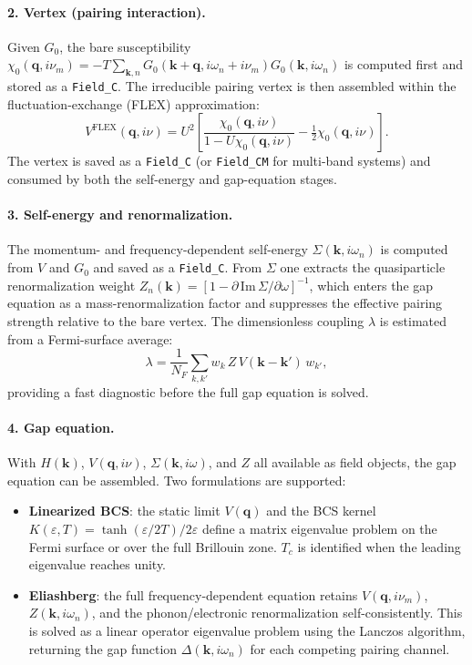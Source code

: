 \paragraph{2. Vertex (pairing interaction).}
Given $G_0$, the bare susceptibility
$\chi_0(\mathbf{q},i\nu_m) = -T\sum_{\mathbf{k},n} G_0(\mathbf{k}+\mathbf{q},i\omega_n+i\nu_m)
G_0(\mathbf{k},i\omega_n)$
is computed first and stored as a \texttt{Field\_C}.  The irreducible pairing vertex
is then assembled within the fluctuation-exchange (FLEX) approximation:
\[
    V^{\mathrm{FLEX}}(\mathbf{q},i\nu) =
    U^2 \left[\frac{\chi_0(\mathbf{q},i\nu)}{1 - U\chi_0(\mathbf{q},i\nu)}
    - \tfrac{1}{2}\chi_0(\mathbf{q},i\nu)\right].
\]
The vertex is saved as a \texttt{Field\_C} (or \texttt{Field\_CM} for multi-band
systems) and consumed by both the self-energy and gap-equation stages.

\paragraph{3. Self-energy and renormalization.}
The momentum- and frequency-dependent self-energy
$\Sigma(\mathbf{k},i\omega_n)$ is computed from $V$ and $G_0$ and saved as a
\texttt{Field\_C}.  From $\Sigma$ one extracts the quasiparticle renormalization
weight $Z_n(\mathbf{k}) = [1 - \partial\,\mathrm{Im}\,\Sigma/\partial\omega]^{-1}$,
which enters the gap equation as a mass-renormalization factor and suppresses
the effective pairing strength relative to the bare vertex.  The dimensionless
coupling $\lambda$ is estimated from a Fermi-surface average:
\[
    \lambda = \frac{1}{N_F}\sum_{k,k'} w_k\,Z\,V(\mathbf{k}-\mathbf{k}')\,w_{k'},
\]
providing a fast diagnostic before the full gap equation is solved.

\paragraph{4. Gap equation.}
With $H(\mathbf{k})$, $V(\mathbf{q},i\nu)$, $\Sigma(\mathbf{k},i\omega)$, and $Z$
all available as field objects, the gap equation can be assembled.  Two formulations
are supported:

\begin{itemize}
    \item \textbf{Linearized BCS}: the static limit $V(\mathbf{q})$ and the BCS
        kernel $K(\varepsilon,T) = \tanh(\varepsilon/2T)/2\varepsilon$ define a
        matrix eigenvalue problem on the Fermi surface or over the full Brillouin
        zone.  $T_c$ is identified when the leading eigenvalue reaches unity.
    \item \textbf{Eliashberg}: the full frequency-dependent equation
        retains $V(\mathbf{q},i\nu_m)$, $Z(\mathbf{k},i\omega_n)$, and the
        phonon/electronic renormalization self-consistently.  This is solved as a
        linear operator eigenvalue problem using the Lanczos algorithm, returning
        the gap function $\Delta(\mathbf{k},i\omega_n)$ for each competing pairing
        channel.
\end{itemize}

